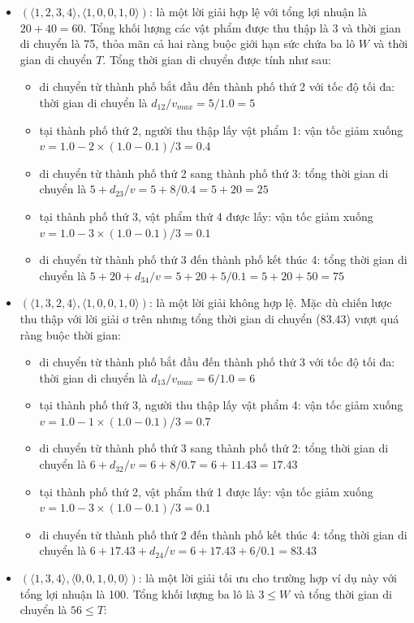 \begin{itemize}
    \item $(\langle1,2,3,4\rangle,\langle1,0,0,1,0\rangle)$: là một lời giải hợp lệ với tổng lợi nhuận là $20+40=60$. Tổng khối lượng các vật phẩm được thu thập là 3 và thời gian di chuyển là 75, thỏa mãn cả hai ràng buộc giới hạn sức chứa ba lô $W$ và thời gian di chuyển $T$. Tổng thời gian di chuyển được tính như sau:
    \begin{itemize}
        \item di chuyển từ thành phố bắt đầu đến thành phố thứ 2 với tốc độ tối đa: thời gian di chuyển là $d_{12}/v_{max}=5/1.0=5$ 
    	\item tại thành phố thứ 2, người thu thập lấy vật phẩm 1: vận tốc giảm xuống $v=1.0-2\times(1.0-0.1)/3=0.4$ 
    	\item di chuyển từ thành phố thứ 2 sang thành phố thứ 3: tổng thời gian di chuyển là $5+d_{23}/v=5+8/0.4=5+20=25$ 
    	\item tại thành phố thứ 3, vật phẩm thứ 4 được lấy: vận tốc giảm xuống $v=1.0-3\times(1.0-0.1)/3=0.1$ 
    	\item di chuyển từ thành phố thứ 3 đến thành phố kết thúc 4: tổng thời gian di chuyển là $5+20+d_{34}/v=5+20+5/0.1=5+20+50=75$ 
    \end{itemize}
    \item $(\langle1,3,2,4\rangle,\langle1,0,0,1,0\rangle)$: là một lời giải không hợp lệ. Mặc dù chiến lược thu thập với lời giải ơ trên nhưng tổng thời gian di chuyển (83.43) vượt quá ràng buộc thời gian:
    \begin{itemize}
        \item di chuyển từ thành phố bắt đầu đến thành phố thứ 3 với tốc độ tối đa: thời gian di chuyển là $d_{13}/v_{max}=6/1.0=6$ 
    	\item tại thành phố thứ 3, người thu thập lấy vật phẩm 4: vận tốc giảm xuống $v=1.0-1\times(1.0-0.1)/3=0.7$ 
    	\item di chuyển từ thành phố thứ 3 sang thành phố thứ 2: tổng thời gian di chuyển là $6+d_{32}/v=6+8/0.7=6+11.43=17.43$ 
    	\item tại thành phố thứ 2, vật phẩm thứ 1 được lấy: vận tốc giảm xuống $v=1.0-3\times(1.0-0.1)/3=0.1$ 
    	\item di chuyển từ thành phố thứ 2 đến thành phố kết thúc 4: tổng thời gian di chuyển là $6+17.43+d_{24}/v=6+17.43+6/0.1=83.43$ 
    \end{itemize}
	\item $(\langle1,3,4\rangle,\langle0,0,1,0,0\rangle)$: là một lời giải tối ưu cho trường hợp ví dụ này với tổng lợi nhuận là 100. Tổng khối lượng ba lô là $3\leq W$ và tổng thời gian di chuyển là $56 \leq T$:

\end{itemize}
